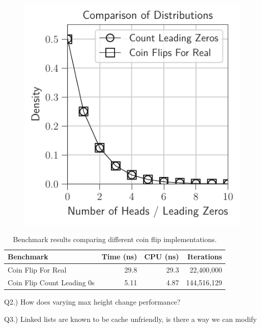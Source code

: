 \documentclass[12pt]{article}
\begin{document}
\begin{figure}[H]
\begin{minipage}{0.32\textwidth}
		\label{fig:coin_flips_count_leading}
	\end{minipage}\hfill
	\begin{minipage}{0.32\textwidth}
		\centering
		\includegraphics[width=\linewidth]{../notebook/plot/comparison_of_distributions.pdf}
		\label{fig:coin_flips_comparison}
	\end{minipage}
\end{figure}


\begin{table}[h]
	\centering
	\small
	\begin{tabular}{lrrr}
		\hline
		\textbf{Benchmark} & \textbf{Time (ns)} & \textbf{CPU (ns)} & \textbf{Iterations} \\
		\hline
		Coin Flip For Real & 29.8 & 29.3 & 22,400,000 \\
		\hline
		Coin Flip Count Leading 0s & 5.11 & 4.87 & 144,516,129 \\
	\end{tabular}
	\caption{Benchmark results comparing different coin flip implementations.}
	\label{tab:benchmark_results}
\end{table}

Q2.) How does varying max height change performance?

Q3.) Linked lists are known to be cache unfriendly, is there a way we can modify 
\end{document}
